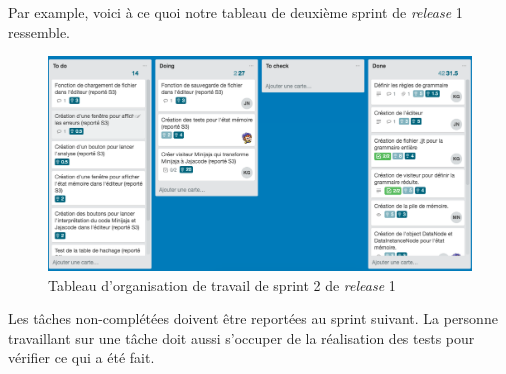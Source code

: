 \documentclass[a4paper,12pt]{article}
\begin{document}
Par example, voici à ce quoi notre tableau de deuxième sprint de \textit{release} 1 ressemble.

\begin{figure}[H]
\begin{center}
	\includegraphics[scale=0.3]{sprint2}
	\caption{Tableau d'organisation de travail de sprint 2 de \textit{release} 1}
\end{center}
\end{figure}

Les tâches non-complétées doivent être reportées au sprint suivant. La personne travaillant sur une tâche doit aussi s'occuper de la réalisation des tests pour vérifier ce qui a été fait.
\end{document}
